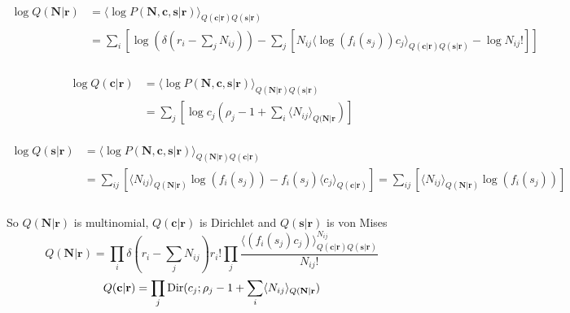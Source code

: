\documentclass[12pt]{article}
\begin{document}
\\
\begin{equation}
\begin{aligned}
\log Q(\mathbf{N|r}) &= \langle \log P(\mathbf{N, c, s|r}) \rangle_{Q(\mathbf{c|r})Q(\mathbf{s|r})}\\
&= \sum_i [\log(\delta(r_i - \sum_j N_{ij})) - \sum_j [N_{ij} \langle \log(f_i (s_j)) c_j \rangle_{Q(\mathbf{c|r})Q(\mathbf{s|r})} - \log N_{ij}!]]\\
\end{aligned}
\end{equation}
\\
\begin{equation}
\begin{aligned}
\log Q(\mathbf{c|r}) &= \langle \log P(\mathbf{N, c, s|r}) \rangle_{Q(\mathbf{N|r})Q(\mathbf{s|r})}\\
&= \sum_j [\log c_j(\rho_j - 1 + \sum_i \langle N_{ij} \rangle_{Q(\mathbf{N|r}})]
\end{aligned}
\end{equation}
\\
\begin{equation}
\begin{aligned}
\log Q(\mathbf{s|r}) &= \langle \log P(\mathbf{N, c, s|r}) \rangle_{Q(\mathbf{N|r})Q(\mathbf{c|r})}\\
&= \sum_{ij} [\langle N_{ij} \rangle_{Q(\mathbf{N|r})} \log(f_i(s_j)) - f_i(s_j) \langle c_j \rangle_{Q(\mathbf{c|r})}] = \sum_{ij} [\langle N_{ij} \rangle_{Q(\mathbf{N|r})} \log(f_i(s_j))]\\
\end{aligned}
\end{equation}
\\
So $Q(\mathbf{N|r})$ is multinomial, $Q(\mathbf{c|r})$ is Dirichlet and $Q(\mathbf{s|r})$ is von Mises\\
\begin{equation}
Q(\mathbf{N|r}) = \prod_i \delta(r_i - \sum_j N_{ij}) r_i! \prod_j \frac{\langle (f_i (s_j) c_j) \rangle_{Q(\mathbf{c|r})Q(\mathbf{s|r})}^{N_{ij}}}{N_{ij}!}
\end{equation}
\begin{equation}
Q(\mathbf{c|r}) = \prod_j \text{Dir}(c_j; \rho_j - 1 + \sum_i \langle N_{ij} \rangle_{Q(\mathbf{N|r}})\\
\end{equation}
\\
\end{document}
